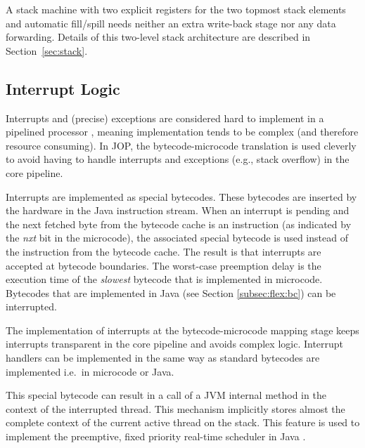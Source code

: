A stack machine with two explicit registers for the two topmost
stack elements and automatic fill/spill needs neither an extra
write-back stage nor any data forwarding. Details of this two-level
stack architecture are described in Section~\ref{sec:stack}.

%
%

\subsection{Interrupt Logic}
\label{sec:interrupt}

Interrupts and (precise) exceptions are considered hard to implement
in a pipelined processor \cite{Hennessy02}, meaning implementation
tends to be complex (and therefore resource consuming). In JOP, the
bytecode-microcode translation is used cleverly to avoid having to
handle interrupts and exceptions (e.g., stack overflow) in the core
pipeline.

Interrupts are implemented as special bytecodes. These bytecodes are
inserted by the hardware in the Java instruction stream. When an
interrupt is pending and the next fetched byte from the bytecode
cache is an instruction (as indicated by the \emph{nxt} bit in the
microcode), the associated special bytecode is used instead of the
instruction from the bytecode cache. The result is that interrupts
are accepted at bytecode boundaries. The worst-case preemption delay
is the execution time of the \emph{slowest} bytecode that is
implemented in microcode. Bytecodes that are implemented in Java
(see Section \ref{subsec:flex:bc}) can be interrupted.

The implementation of interrupts at the bytecode-microcode mapping
stage keeps interrupts transparent in the core pipeline and avoids
complex logic. Interrupt handlers can be implemented in the same way
as standard bytecodes are implemented i.e.\ in microcode or Java.

This special bytecode can result in a call of a JVM internal method
in the context of the interrupted thread. This mechanism implicitly
stores almost the complete context of the current active thread on
the stack. This feature is used to implement the preemptive, fixed
priority real-time scheduler in Java \cite{jop:javasched}.

